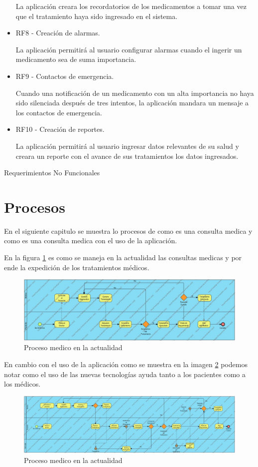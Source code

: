 \begin{itemize}
	La aplicación creara los recordatorios de los medicamentos a tomar  una vez que el tratamiento haya sido ingresado en el sistema.
	
	\item RF8 - Creación de alarmas.
	
	La aplicación permitirá al usuario configurar alarmas cuando el ingerir un medicamento sea de suma importancia.
	
	\item RF9 - Contactos de emergencia.
	
	Cuando una notificación de un medicamento con un alta importancia no haya sido silenciada después de tres intentos, la aplicación mandara un mensaje a los contactos de emergencia.
	
	\item RF10 - Creación de reportes.
	
	La aplicación permitirá al usuario ingresar datos relevantes de su salud y creara un reporte con el avance de sus tratamientos los datos ingresados.
	
	
	
	
	
	
\end{itemize}
Requerimientos No Funcionales

\section{Procesos}

En el siguiente capitulo se muestra lo procesos de como es una consulta medica y como es una consulta medica con el uso de la aplicación.


En la figura \ref{fig:proceso1} es como se maneja en la actualidad las consultas medicas y por ende la expedición de los tratamientos médicos.
\begin{figure}[htb]
	\centering
	\includegraphics[width=1.1\textwidth]{images/cap2/ProcesoMedico}
	\caption{Proceso medico en la actualidad} \label{fig:proceso1}
\end{figure}

En cambio con el uso de la aplicación como se muestra en la imagen \ref{fig:proceso2} podemos notar como el uso de las nuevas tecnologías ayuda tanto a los pacientes como a los médicos.

\begin{figure}[htb]
	\centering
	\includegraphics[width=1.1\textwidth]{images/cap2/RemPillstratamiento}
	\caption{Proceso medico en la actualidad} \label{fig:proceso2}
\end{figure}